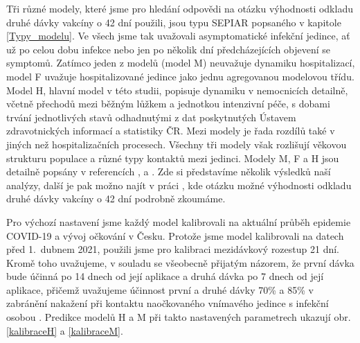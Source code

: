 Tři různé modely, které jsme pro hledání odpovědi na otázku výhodnosti odkladu druhé dávky vakcíny o 42 dní použili, jsou typu SEPIAR popsaného v kapitole \ref{Typy_modelu}. Ve všech jsme tak uvažovali asymptomatické infekční jedince, ať už po celou dobu infekce nebo jen po několik dní předcházejících objevení se symptomů. Zatímco jeden z modelů (model M) neuvažuje dynamiku hospitalizací, model F uvažuje hospitalizované jedince jako jednu agregovanou modelovou třídu. Model H, hlavní model v této studii, popisuje dynamiku v nemocnicích detailně, včetně přechodů mezi běžným lůžkem a jednotkou intenzivní péče, s dobami trvání jednotlivých stavů odhadnutými z dat poskytnutých Ústavem zdravotnických informací a statistiky ČR. Mezi modely je řada rozdílů také v jiných než hospitalizačních procesech. Všechny tři modely však rozlišují věkovou strukturu populace a různé typy kontaktů mezi jedinci. Modely M, F a H jsou detailně popsány v referencích \cite{M-techrep2021}, \cite{Smid2021seir} a \cite{vaccpaper}. Zde si představíme několik výsledků naší analýzy, další je pak možno najít v práci \cite{vaccpaper}, kde otázku možné výhodnosti odkladu druhé dávky vakcíny o 42 dní podrobně zkoumáme. 

Pro výchozí nastavení jsme každý model kalibrovali na aktuální průběh epidemie COVID-19 a vývoj očkování v Česku. Protože jsme model kalibrovali na datech před 1.\ dubnem 2021, použili jsme pro kalibraci mezidávkový rozestup 21 dní. Kromě toho uvažujeme, v souladu se všeobecně přijatým názorem, že první dávka bude účinná po 14 dnech od její aplikace a druhá dávka po 7 dnech od její aplikace, přičemž uvažujeme účinnost první a druhé dávky 70\% a 85\% v zabránění nakažení při kontaktu naočkovaného vnímavého jedince s infekční osobou \cite{Hall_etal2021}. Predikce modelů H a M při takto nastavených parametrech ukazují obr.\,\ref{kalibraceH} a \ref{kalibraceM}. 

